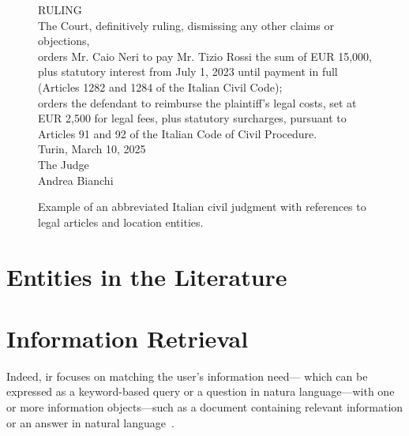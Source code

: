 \begin{figure}[htbp]
\begin{minipage}{0.9\linewidth}
RULING\\
The Court, definitively ruling, dismissing any other claims or objections,\\
orders Mr. Caio Neri to pay Mr. Tizio Rossi the sum of EUR 15,000, plus statutory interest from July 1, 2023 until payment in full (Articles 1282 and 1284 of the Italian Civil Code);\\
orders the defendant to reimburse the plaintiff's legal costs, set at EUR 2,500 for legal fees, plus statutory surcharges, pursuant to Articles 91 and 92 of the Italian Code of Civil Procedure.\\[1em]
Turin, March 10, 2025\\
The Judge\\
Andrea Bianchi
\end{minipage}
\caption{Example of an abbreviated Italian civil judgment with references to legal articles and location entities.}
\label{fig:civil-judgment-legal-articles}
\end{figure}




\section{Entities in the Literature}







\section{Information Retrieval}


Indeed, \acl{ir} focuses on matching the user's information need--- which can be expressed as a keyword-based query or a question in natura language---with one or more information objects---such as a document containing relevant information or an answer in natural language~\cite{entityorientedsearch2018}.




